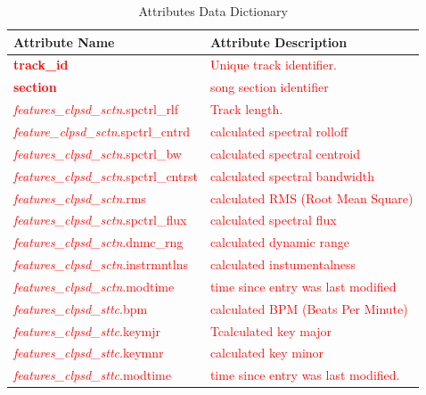 \documentclass[12pt]{article}
\begin{document}
\begin{table}[htbp!]
  \centering
  \begin{tabular}{ p{.45\linewidth} || p{.55\linewidth} }
    \textbf{Attribute Name} & \textbf{Attribute Description} \\
    \toprule
    \textcolor{red}{\textbf{track\_id}} & \textcolor{red}{Unique track identifier.} \\
    \midrule
    \textcolor{red}{\textbf{section}} & \textcolor{red}{song section identifier} \\
    \midrule
    \textcolor{red}{\emph{features\_clpsd\_sctn}.spctrl\_rlf} & \textcolor{red}{Track length. } \\
    \midrule
    \textcolor{red}{\emph{feature\_clpsd\_sctn}.spctrl\_cntrd} & \textcolor{red}{calculated spectral rolloff } \\
    \midrule
    \textcolor{red}{\emph{features\_clpsd\_sctn}.spctrl\_bw} & \textcolor{red}{calculated spectral centroid } \\
    \midrule
    \textcolor{red}{\emph{features\_clpsd\_sctn}.spctrl\_cntrst} & \textcolor{red}{calculated spectral bandwidth } \\
    \midrule
    \textcolor{red}{\emph{features\_clpsd\_sctn}.rms} & \textcolor{red}{calculated RMS (Root Mean Square) } \\
    \midrule
    \textcolor{red}{\emph{features\_clpsd\_sctn}.spctrl\_flux} & \textcolor{red}{calculated spectral flux } \\
    \midrule
    \textcolor{red}{\emph{features\_clpsd\_sctn}.dnmc\_rng} & \textcolor{red}{calculated dynamic range } \\
    \midrule
    \textcolor{red}{\emph{features\_clpsd\_sctn}.instrmntlns} & \textcolor{red}{calculated instumentalness } \\
    \midrule
    \textcolor{red}{\emph{features\_clpsd\_sctn}.modtime} & \textcolor{red}{ time since entry was last modified } \\
    \midrule
    \textcolor{red}{\emph{features\_clpsd\_sttc}.bpm} & \textcolor{red}{calculated BPM (Beats Per Minute) } \\
    \midrule
    \textcolor{red}{\emph{features\_clpsd\_sttc}.keymjr} & \textcolor{red}{Tcalculated key major } \\
    \midrule
    \textcolor{red}{\emph{features\_clpsd\_sttc}.keymnr} & \textcolor{red}{calculated key minor } \\
    \midrule
    \textcolor{red}{\emph{features\_clpsd\_sttc}.modtime} & \textcolor{red}{time since entry was last modified. } \\
    \midrule
  \end{tabular}
  \label{tbl:attr-data-dict}
  \caption{Attributes Data Dictionary}
\end{table}
\vspace{1cm}
\end{document}
